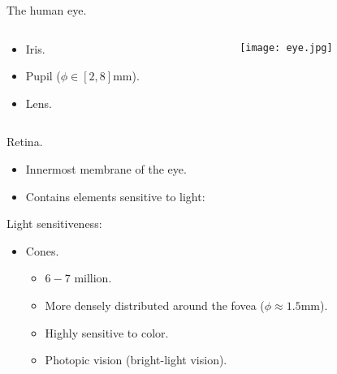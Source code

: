 
\begin{frame}
The human eye.
\begin{columns}
\begin{column}{.3\textwidth}
\begin{itemize}
\item Iris.
\item Pupil ($\phi\in [2,8] \text{mm}$).
\item Lens.
\end{itemize}
\end{column}
\begin{column}{.7\textwidth}
\begin{figure}
\texttt{[image: eye.jpg]}
\end{figure}
\end{column}
\end{columns}
\end{frame}


\begin{frame}
Retina.
\begin{itemize}
\item Innermost membrane of the eye.
\item Contains elements sensitive to light:
\end{itemize}
Light sensitiveness:
\begin{itemize}
\item Cones.
\begin{itemize}
\item $6-7$ million.
\item More densely distributed around the fovea ($\phi\approx 1.5$mm).
\item Highly sensitive to color.
\item Photopic vision (bright-light vision).
\end{itemize}
\end{itemize}
\end{frame}



